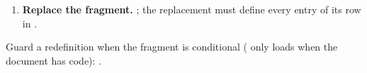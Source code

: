 \documentclass[a4paper,twoside]{article}
\begin{document}
\begin{enumerate}
\begin{tscode}[lang=latex, engine=pygments]
\begin{Verbatim}[commandchars=\\\{\},breaklines, breakanywhere, commandchars=\\\{\}]
\end{Verbatim}
\end{tscode}
A custom  container is a  environment defined the
same way (one optional argument, the raw key list; the parsed keys are in
, , ).
\item \textbf{Replace the fragment.} ; the replacement must define every  entry of
its row in .
\end{enumerate}
Guard a redefinition when the fragment is conditional ( only loads
when the document has code): .
\end{document}
